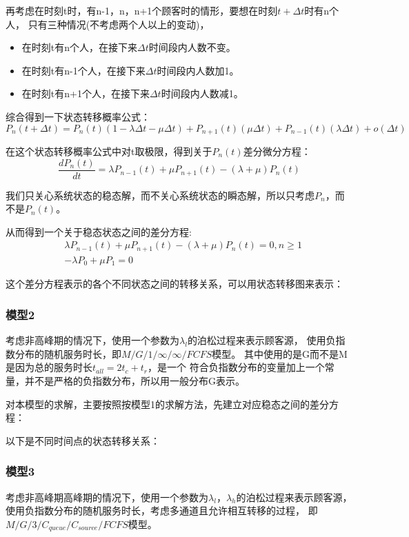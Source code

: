 \documentclass{article}
\begin{document}
再考虑在时刻t时，有n-1，n，n+1个顾客时的情形，要想在时刻$t+\Delta t$时有n个人，
只有三种情况(不考虑两个人以上的变动)，
\begin{itemize}
\item 在时刻t有n个人，在接下来$\Delta t$时间段内人数不变。
\item 在时刻t有n-1个人，在接下来$\Delta t$时间段内人数加1。
\item 在时刻t有n+1个人，在接下来$\Delta t$时间段内人数减1。 
\end{itemize}


综合得到一下状态转移概率公式：
\begin{equation}
    P_n(t+\Delta t)=P_n(t)(1-\lambda \Delta t-\mu \Delta t)+P_{n+1}(t)(\mu \Delta t) +P_{n-1}(t)(\lambda \Delta t)+o(\Delta t)
\end{equation}

在这个状态转移概率公式中对t取极限，得到关于$P_n(t)$差分微分方程：
\begin{equation}
    \frac{d P_n(t)}{dt}=\lambda P_{n-1}(t)+\mu P_{n+1}(t)-(\lambda+\mu )P_n(t)
\end{equation}

我们只关心系统状态的稳态解，而不关心系统状态的瞬态解，所以只考虑$P_n$，而不是$P_n(t)$。

从而得到一个关于稳态状态之间的差分方程:
\begin{equation}
    \begin{aligned}
        & \lambda P_{n-1}(t)+\mu P_{n+1}(t)-(\lambda+\mu )P_n(t)=0,n\geq 1 \\
        & -\lambda P_{0}+\mu P_{1}=0
    \end{aligned}
\end{equation}

这个差分方程表示的各个不同状态之间的转移关系，可以用状态转移图来表示：


\subsubsection{模型2}
考虑非高峰期的情况下，使用一个参数为$\lambda_{l}$的泊松过程来表示顾客源，
使用负指数分布的随机服务时长，即$M/G/1/\infty/\infty/FCFS$模型。
其中使用的是G而不是M是因为总的服务时长$t_{all}=2t_{c}+t_{r}$，是一个
符合负指数分布的变量加上一个常量，并不是严格的负指数分布，所以用一般分布G表示。

对本模型的求解，主要按照按模型1的求解方法，先建立对应稳态之间的差分方程：


以下是不同时间点的状态转移关系：

\subsubsection{模型3}
考虑非高峰期高峰期的情况下，使用一个参数为$\lambda_{l}，\lambda_{h}$的泊松过程来表示顾客源，
使用负指数分布的随机服务时长，考虑多通道且允许相互转移的过程，
即$M/G/3/C_{queue}/C_{source}/FCFS$模型。
\end{document}
